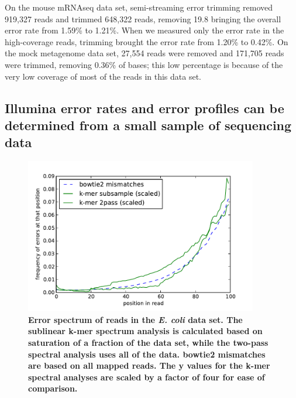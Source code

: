 \documentclass{article}
\begin{document}


On the mouse mRNAseq data set, semi-streaming error trimming removed 919,327
reads and trimmed 648,322 reads, removing 19.8%
bringing the overall error rate from 1.59\% to 1.21\%.  When we measured
only the error rate in the high-coverage reads, trimming brought the
error rate from 1.20\% to 0.42\%.  On the mock metagenome data set,
27,554 reads were removed and 171,705 reads were trimmed, removing 0.36\%
of bases; this low percentage is because of the very low coverage of
most of the reads in this data set.

\subsection{Illumina error rates and error profiles can be determined from a
small sample of sequencing data}

\begin{figure}[!ht]
 \centerline{\includegraphics[width=4in]{./figures/ecoli-errhist}}
\caption{{\bf Error spectrum of reads in the {\em E. coli} data
    set. The sublinear k-mer spectrum analysis is calculated based on
    saturation of a fraction of the data set, while the two-pass
    spectral analysis uses all of the data.  bowtie2 mismatches are
    based on all mapped reads.  The y values for the k-mer spectral
    analyses are scaled by a factor of four for ease of comparison.}}
\label{fig:ecoli_err}
\end{figure}
\end{document}
